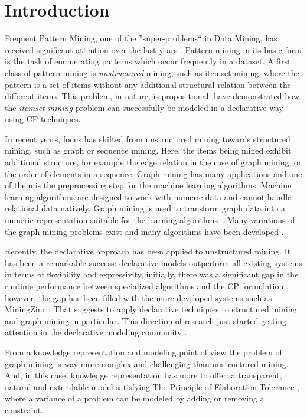 \section{Introduction}
Frequent Pattern Mining, one of the ''super-problems`` in Data Mining, has received significant attention over the last years \citep{pattern_mining_book}. Pattern mining in its basic form is the task of enumerating patterns which occur frequently in a dataset.
A first class of pattern mining is \emph{unstructured} mining, such as itemset mining, where the pattern is a set of items without any additional structural relation between the different items.
This problem, in nature, is propositional.
\citet{tias_original} have demonstrated how the \emph{itemset mining} problem can successfully be modeled in a declarative way using CP techniques.

In recent years, focus has shifted from unstructured mining towards structured mining, such as graph or sequence mining.
Here, the items being mined exhibit additional structure, for example the edge relation in the case of graph mining, or the order of elements in a sequence. Graph mining has many applications and one of them is the preprocessing step for the machine learning algorithms. Machine learning algorithms are designed to work with numeric data and cannot handle relational data natively. Graph mining is used to transform graph data into a numeric representation suitable for the learning algorithms~\citep{pattern_mining_classification}. Many variations of the graph mining problems exist \citep{subtree_overview} and many algorithms have been developed \citep{gspan,theta_subsumption}.

Recently, the declarative approach has been applied to unstructured mining. It has been a remarkable success: declarative models outperform all existing systems in terms of flexibility and expressivity, initially, there was a significant gap in the runtime performance between specialized algorithms and the CP formulation \citep{tias_original,mining_cp_extra}, however, the gap has been filled with the more developed systems such as MiningZinc \citep{tias_declarative_pattern_mining}. That suggests to apply declarative techniques to structured mining and graph mining in particular. This direction of research just started getting attention in the declarative modeling community \citep{cp_sequence_mining,ilp_graph_mining}. 

From a knowledge representation and modeling point of view the problem of graph mining is way more complex and challenging than unstructured mining. And, in this case, knowledge representation has more to offer: a transparent, natural and extendable model satisfying The Principle of Elaboration Tolerance \citep{elaboration_tolerance}, where a variance of a problem can be modeled by adding or removing a constraint. 

